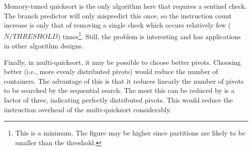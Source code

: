 Memory-tuned quicksort is the only algorithm here that requires a sentinel
check. The branch predictor will only mispredict this once, so the instruction
count increase is only that of removing a single check which occurs relatively
few ($N / THRESHOLD$) times\footnote{This is a minimum. The figure may be higher
since partitions are likely to be smaller than the threshold.}. Still, the
problem is interesting and has applications in other algorithm designs.

Finally, in multi-quicksort, it may be possible to choose better pivots.
Choosing better (i.e., more evenly distributed pivots) would reduce the number of
containers. The advantage of this is that it reduces linearly the number of
pivots to be searched by the sequential search. The most this can be reduced by
is a factor of three, indicating perfectly distributed pivots. This would reduce
the instruction overhead of the multi-quicksort considerably.
